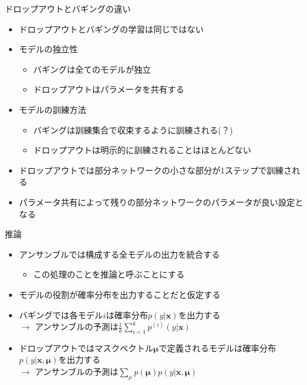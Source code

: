 \documentclass[dvipdfmx, 10pt]{beamer}
\begin{document}

\begin{frame}{ドロップアウトとバギングの違い}
  \begin{itemize}
    \item ドロップアウトとバギングの学習は同じではない
    \item モデルの独立性
    \begin{itemize}
      \item バギングは全てのモデルが独立
      \item ドロップアウトはパラメータを共有する
    \end{itemize}
    \item モデルの訓練方法
    \begin{itemize}
      \item バギングは訓練集合で収束するように訓練される(？)
      \item ドロップアウトは明示的に訓練されることはほとんどない
    \end{itemize}
    \item ドロップアウトでは部分ネットワークの小さな部分が1ステップで訓練される
    \item パラメータ共有によって残りの部分ネットワークのパラメータが良い設定となる
  \end{itemize}
\end{frame}


\begin{frame}{推論}
  \begin{itemize}
    \item アンサンブルでは構成する全モデルの出力を統合する
    \begin{itemize}
      \item この処理のことを\alert{推論}と呼ぶことにする
    \end{itemize}
    \item モデルの役割が確率分布を出力することだと仮定する
    \item バギングでは各モデル$i$は確率分布$p(y|\bm{x})$を出力する\\
    $\rightarrow$ アンサンブルの予測は$\frac{1}{k} \sum_{i=1}^{k} p^{(i)}(y | \boldsymbol{x})$
    \item ドロップアウトではマスクベクトル$\boldsymbol{\mu}$で定義されるモデルは確率分布$p(y|\bm{x}, \boldsymbol{\mu})$を出力する\\
      $\rightarrow$ アンサンブルの予測は$\sum_{\mu} p(\boldsymbol{\mu}) p(y | \boldsymbol{x}, \boldsymbol{\mu})$ 
  \end{itemize}
\end{frame}
\end{document}
